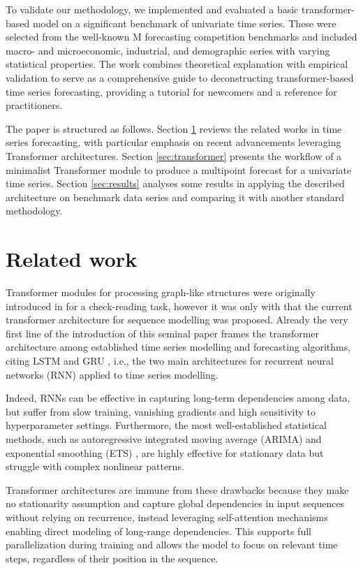\documentclass[algorithms,article,submit,pdftex,moreauthors]{Definitions/mdpi}
\begin{document}
To validate our methodology, we implemented and evaluated a basic transformer-based model on a significant benchmark of univariate time series. These were selected from the well-known M forecasting competition benchmarks and included macro- and microeconomic, industrial, and demographic series with varying statistical properties. The work combines theoretical explanation with empirical validation to serve as a comprehensive guide to deconstructing transformer-based time series forecasting, providing a tutorial for newcomers and a reference for practitioners.

The paper is structured as follows. Section \ref{sec:literature} reviews the related works in time series forecasting, with particular emphasis on recent advancements leveraging Transformer architectures. Section \ref{sec:transformer} presents the workflow of a minimalist Transformer module to produce a multipoint forecast for a univariate time series. Section \ref{sec:results} analyses some results in applying the described architecture on benchmark data series and comparing it with another standard methodology.

\section{Related work} \label{sec:literature}

Transformer modules for processing graph-like structures were originally introduced in \citep{LBB97} for a check-reading task, however it was only with \citep{VSPU17} that the current transformer architecture for sequence modelling was proposed. Already the very first line of the introduction of this seminal paper frames the transformer architecture among established time series modelling and forecasting algorithms, citing LSTM \citep{HS97} and GRU \citep{ CGCB14}, i.e., the two main architectures for recurrent neural networks (RNN) applied to time series modelling.

Indeed, RNNs can be effective in capturing long-term dependencies among data, but suffer from slow training, vanishing gradients and high sensitivity to hyperparameter settings. Furthermore, the most well-established statistical methods, such as autoregressive integrated moving average (ARIMA) \citep{BJ70} and exponential smoothing (ETS) \citep{H57,W60}, are highly effective for stationary data but struggle with complex nonlinear patterns.

Transformer architectures are immune from these drawbacks because they make no stationarity assumption and capture global dependencies in input sequences without relying on recurrence, instead leveraging self-attention mechanisms enabling direct modeling of long-range dependencies. This supports full parallelization during training and allows the model to focus on relevant time steps, regardless of their position in the sequence.
\end{document}
